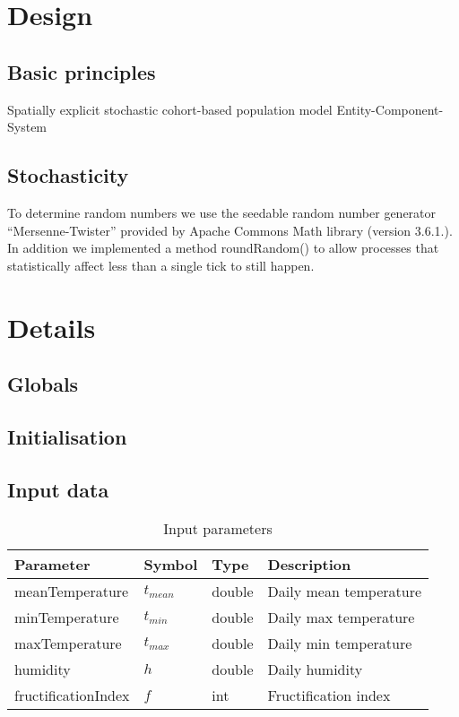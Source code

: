 \documentclass[a4paper, 11pt]{scrartcl}
\begin{document}
\section{Design}


\subsection{Basic principles}
Spatially explicit stochastic cohort-based population model
Entity-Component-System

\subsection{Stochasticity}
To determine random numbers we use the seedable random number generator ``Mersenne-Twister'' provided by Apache Commons Math library
(version 3.6.1.). In addition we implemented a method roundRandom() to allow processes that statistically affect less than
a single tick to still happen.


\section{Details}

\subsection{Globals}

\subsection{Initialisation}

\subsection{Input data}


\begin{table}[h!]
\caption{Input parameters}
\label{input_parameters}
\begin{tabularx}{\textwidth}{llll}
\toprule
\textbf{Parameter} & \textbf{Symbol} & \textbf{Type}     & \textbf{Description}       \\
\midrule
meanTemperature    & $t_{mean}$      & double            & Daily mean temperature     \\
minTemperature     & $t_{min}$       & double            & Daily max temperature      \\
maxTemperature     & $t_{max}$       & double            & Daily min temperature      \\
humidity           & $h$             & double            & Daily humidity             \\
\midrule
fructificationIndex & $f$            & int               & Fructification index       \\
\bottomrule
\end{tabularx}
\end{table}
\end{document}
